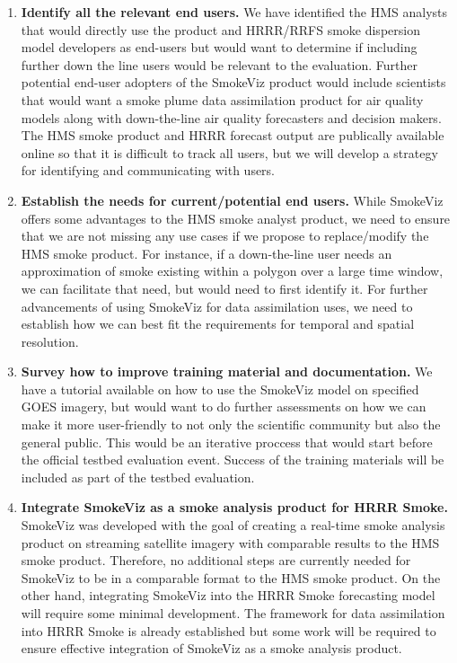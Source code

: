 \begin{enumerate}
    \item \textbf{Identify all the relevant end users.} We have identified the HMS analysts that would directly use the product and HRRR/RRFS smoke dispersion model developers as end-users but would want to determine if including further down the line users would be relevant to the evaluation. Further potential end-user adopters of the SmokeViz product would include scientists that would want a smoke plume data assimilation product for air quality models along with down-the-line air quality forecasters and decision makers. The HMS smoke product and HRRR forecast output are publically available online so that it is difficult to track all users, but we will develop a strategy for identifying and communicating with users. 

    \item \textbf{Establish the needs for current/potential end users.} While SmokeViz offers some advantages to the HMS smoke analyst product, we need to ensure that we are not missing any use cases if we propose to replace/modify the HMS smoke product. For instance, if a down-the-line user needs an approximation of smoke existing within a polygon over a large time window, we can facilitate that need, but would need to first identify it. For further advancements of using SmokeViz for data assimilation uses, we need to establish how we can best fit the requirements for temporal and spatial resolution.

    \item \textbf{Survey how to improve training material and documentation.} We have a tutorial available on how to use the SmokeViz model on specified GOES imagery, but would want to do further assessments on how we can make it more user-friendly to not only the scientific community but also the general public. This would be an iterative proccess that would start before the official testbed evaluation event. Success of the training materials will be included as part of the testbed evaluation.


    \item \textbf{Integrate SmokeViz as a smoke analysis product for HRRR Smoke.} SmokeViz was developed with the goal of creating a real-time smoke analysis product on streaming satellite imagery with comparable results to the HMS smoke product. Therefore, no additional steps are currently needed for SmokeViz to be in a comparable format to the HMS smoke product. On the other hand, integrating SmokeViz into the HRRR Smoke forecasting model will require some minimal development. The framework for data assimilation into HRRR Smoke is already established but some work will be required to ensure effective integration of SmokeViz as a smoke analysis product.



\end{enumerate}
